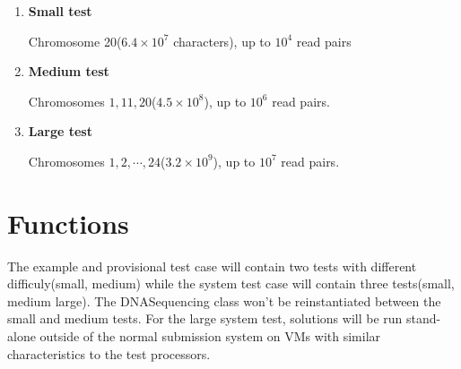 \documentclass[hyperref,UTF8]{ctexart}
\theoremstyle{definition}
\theoremstyle{remark}
\numberwithin{equation}{subsection}
\newcommand{\Emph}{\textbf}
\begin{document}
	\begin{enumerate}
	
		\item \Emph{Small test}
		
		Chromosome 20($6.4\times10^7$ characters), up to $10^4$ read pairs
		
		\item \Emph{Medium test}
		
		Chromosomes $1, 11, 20$($4.5\times10^8$), up to $10^6$ read pairs.
		
		\item \Emph{Large test}
		
		Chromosomes $1, 2, \cdots, 24$($3.2\times10^9$), up to $10^7$ read pairs.
		
	\end{enumerate}
	
\section{Functions}
	
	The example and provisional test case will contain two tests with different difficuly(small, medium)
	while the system test case will contain three tests(small, medium large).
	The DNASequencing class won't be reinstantiated between the small and medium tests.
	For the large system test, solutions will be run stand-alone outside of the normal submission
	system on VMs with similar characteristics to the test processors.
	
\end{document}
